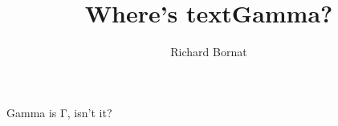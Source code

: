 \documentclass[11pt]{article}
\title{Where's textGamma?}
\author{Richard Bornat}
\begin{document}
\maketitle

Gamma is Γ, isn't it?
\end{document}
